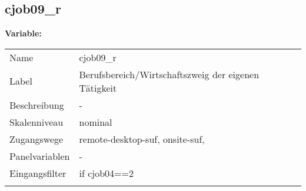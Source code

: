 	
	
	\subsection{cjob09\_r}
	\label{subSection:cjob09_r}

	\noindent\textbf{Variable:}\\
		\begin{tabular}{lL{11.3cm}}
			\label{tableVariable:cjob09_r}
			Name & cjob09\_r \\
			Label & Berufsbereich/Wirtschaftszweig der eigenen Tätigkeit \\
			Beschreibung & - \\
			Skalenniveau & nominal \\
			Zugangswege &
				remote-desktop-suf,
				onsite-suf,
 \\
			Panelvariablen & -
			 \\
			Eingangsfilter & if cjob04==2 \\
 \\
		\end{tabular}






